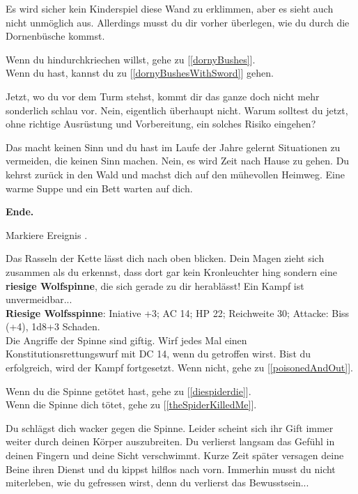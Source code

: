 
Es wird sicher kein Kinderspiel diese Wand zu erklimmen, aber es sieht auch nicht unmöglich aus. Allerdings musst du dir vorher überlegen, wie du durch die Dornenbüsche kommst.

Wenn du hindurchkriechen willst, gehe zu [\ref{dornyBushes}].
\\Wenn du  hast, kannst du zu [\ref{dornyBushesWithSword}] gehen.


Jetzt, wo du vor dem Turm stehst, kommt dir das ganze doch nicht mehr sonderlich schlau vor. Nein, eigentlich überhaupt nicht. Warum solltest du jetzt, ohne richtige Ausrüstung und Vorbereitung, ein solches Risiko eingehen?

Das macht keinen Sinn und du hast im Laufe der Jahre gelernt Situationen zu vermeiden, die keinen Sinn machen. Nein, es wird Zeit nach Hause zu gehen. Du kehrst zurück in den Wald und machst dich auf den mühevollen Heimweg. Eine warme Suppe und ein Bett warten auf dich.

\textbf{Ende.}


Markiere Ereignis .

Das Rasseln der Kette lässt dich nach oben blicken. Dein Magen zieht sich zusammen als du erkennst, dass dort gar kein Kronleuchter hing sondern eine \textbf{riesige Wolfspinne}, die sich gerade zu dir herablässt! Ein Kampf ist unvermeidbar...\\

\textbf{Riesige Wolfsspinne}: Iniative +3;
AC 14;
HP 22;
Reichweite 30;
Attacke: Biss (+4), 1d8+3 Schaden.\\

Die Angriffe der Spinne sind giftig. Wirf jedes Mal einen Konstitutionsrettungswurf mit
DC 14, wenn du getroffen wirst. Bist du erfolgreich, wird der Kampf fortgesetzt.
Wenn nicht, gehe zu [\ref{poisonedAndOut}].

Wenn du die Spinne getötet hast, gehe zu [\ref{diespiderdie}].
\\Wenn die Spinne dich tötet, gehe zu [\ref{theSpiderKilledMe}].


Du schlägst dich wacker gegen die Spinne. Leider scheint sich ihr Gift immer weiter durch deinen Körper auszubreiten. Du verlierst langsam das Gefühl in deinen Fingern und deine Sicht verschwimmt.
Kurze Zeit später versagen deine Beine ihren Dienst und du kippst hilflos nach vorn. Immerhin musst du nicht miterleben, wie du gefressen wirst, denn du verlierst das Bewusstsein...

